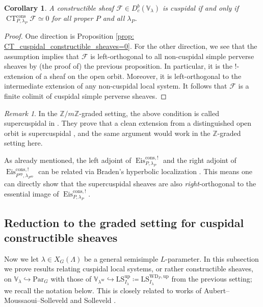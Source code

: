 \documentclass{amsart}
\newtheorem{corollary}[theorem]{Corollary}
\theoremstyle{definition}
\theoremstyle{remark}
\newtheorem{remark}[theorem]{Remark}
\numberwithin{equation}{section}
\newcommand{\mc}{\mathcal}
\newcommand{\Z}{\mathbb{Z}}
\newcommand{\op}{\mathrm{op}}
\newcommand{\Par}{\mathrm{Par}}
\DeclareMathOperator{\Eis}{\mathrm{Eis}}
\DeclareMathOperator{\CT}{\mathrm{CT}}
\newcommand{\ur}{\mathrm{ur}}
\newcommand{\V}{\mathbb{V}}
\newcommand{\up}{\mathrm{up}}
\newcommand{\WD}{\mathrm{WD}}
\newcommand{\LS}{\mathrm{LS}}
\begin{document}
\begin{corollary}\label{cor: LusztigCuspidal_is_equivalent_to_CT_vanishing}
A constructible sheaf $\mc F \in D_c^b (\V_\lambda)$ is cuspidal if and only if $\CT_{P, \lambda_P}^{\mathrm{cons}}\mc F\simeq 0$ for all proper $P$ and all $\lambda_P$. 
\end{corollary}

\begin{proof}
One direction is Proposition \ref{prop: CT_cuspidal_constructible_sheaves=0}. For the other direction, we see that the assumption implies that $\mc F$ is left-orthogonal to all non-cuspidal simple perverse sheaves by (the proof of) the previous proposition. In particular, it is the $!$-extension of a sheaf on the open orbit. Moreover, it is left-orthogonal to the intermediate extension of any non-cuspidal local system. It follows that $\mc F$ is a finite colimit of cuspidal simple perverse sheaves. 
\end{proof}

\begin{remark}
In the $\Z/m\Z$-graded setting, the above condition is called supercuspidal in \cite[Definition 1.12]{LiuTsaiVilonenXue}. They prove that a clean extension from a distinguished open orbit is supercuspidal \cite[Proposition 1.15]{LiuTsaiVilonenXue}, and the same argument would work in the $\Z$-graded setting here. 

As already mentioned, the left adjoint of $\Eis_{P, \lambda_P}^{\mathrm{cons},!}$ and the right adjoint of $\Eis_{P^\op, \lambda_{P^\op}}^{\mathrm{cons},!}$ can be related via Braden's hyperbolic localization \cite{Braden}. This means one can directly show that the supercuspidal sheaves are also \emph{right}-orthogonal to the essential image of $\Eis_{P, \lambda_P}^{\mathrm{cons},!}$.  

\end{remark}

\subsection{Reduction to the graded setting for cuspidal constructible sheaves}{\label{ss: CCSreductiontograded}}

Now we let $\lambda\in X_G (\Lambda)$ be a general semisimple $L$-parameter. In this subsection we prove results relating cuspidal local systems, or rather constructible sheaves, on $\V_{\lambda} \hookrightarrow \Par_G$ with those of $\V_{\lambda^{\ur}} \hookrightarrow \LS^{\up}_{I_{\lambda}}\coloneq \LS_{I_\lambda}^{\WD_F, \up}$ from the previous setting; we recall the notation below. This is closely related to works of Aubert--Moussaoui--Solleveld \cite{AMS1, AMS2} and Solleveld \cite{Solleveld}. 
\end{document}
